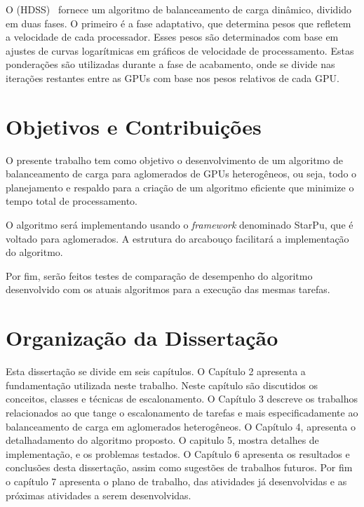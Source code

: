 O  (HDSS)~\citep{HDSS} fornece um algoritmo de balanceamento de carga dinâmico, dividido em duas fases. O primeiro é a fase adaptativo, que determina pesos que refletem a velocidade de cada processador. Esses pesos são determinados com base em ajustes de curvas logarítmicas em gráficos de velocidade de processamento. Estas ponderações são utilizadas durante a fase de acabamento, onde se divide nas iterações restantes entre as GPUs com base nos pesos relativos de cada GPU.


\section{Objetivos e Contribuições}\label{cap1:objetivos}

O presente trabalho tem como objetivo o desenvolvimento de um algoritmo de balanceamento de carga para aglomerados de GPUs heterogêneos, ou seja, todo o planejamento e respaldo para a criação de um algoritmo eficiente que minimize o tempo total de processamento.

O algoritmo será implementando usando o \textit{framework} denominado StarPu, que é voltado para aglomerados. A estrutura do arcabouço facilitará a implementação do algoritmo.

Por fim, serão feitos testes de comparação de desempenho do algoritmo desenvolvido com os atuais algoritmos para a execução das mesmas tarefas.


\section{Organização da Dissertação}\label{cap1:organizacao}

Esta dissertação se divide em seis capítulos. O Capítulo 2 apresenta a fundamentação utilizada neste trabalho. Neste capítulo são discutidos os conceitos, classes e técnicas de escalonamento. O Capítulo 3 descreve os trabalhos relacionados ao que tange o escalonamento de tarefas e mais especificadamente ao balanceamento de carga em aglomerados heterogêneos.
O Capítulo 4, apresenta o detalhadamento do algoritmo proposto. O capitulo 5, mostra detalhes de implementação, e os problemas testados. 
O Capítulo 6 apresenta os resultados e conclusões desta dissertação, assim como sugestões de trabalhos futuros.
Por fim o capítulo 7 apresenta o plano de trabalho, das atividades já desenvolvidas e as próximas atividades a serem desenvolvidas.


